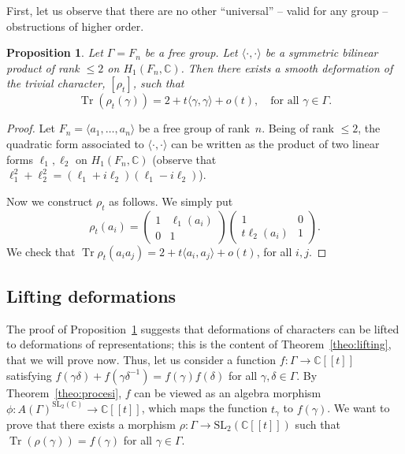 \documentclass[JEP,XML,SOM,Unicode,NoEqCountersInSection]{cedram}
\newcommand{\lbr}{[\![}
\newcommand{\rbr}{]\!]}
\newtheorem{proposition}[theorem]{Proposition}
\theoremstyle{definition}
\newcommand{\CC}{\mathbb{C}}
\newcommand{\tr}{\operatorname{Tr}}
\newcommand{\SL}{\mathrm{SL}}
\begin{document}
First, let us observe that there are no other ``universal'' -- \ie valid
for any group -- obstructions of higher order.
\begin{proposition}\label{prop:PasPlusQueTrois}
Let $\Gamma=F_n$ be a free group. Let $\langle\cdot,\cdot\rangle$ be a
symmetric bilinear product of rank $\leq 2$ on $H_1(F_n,\CC)$.
Then there exists a smooth deformation
of the trivial character, $[\rho_t]$, such that
\[ \tr(\rho_t(\gamma))=2+t\langle\gamma,\gamma\rangle+
o(t), \quad\text{for all }\gamma\in\Gamma. \]
\end{proposition}

\begin{proof}
Let $F_n=\langle a_1,\ldots,a_n\rangle$ be a free group of rank~$n$.
Being of rank $\leq 2$, the quadratic form associated to
$\langle\cdot,\cdot\rangle$
can be written as the product of two linear forms $\ell_1,\ell_2$ on
$H_1(F_n,\CC)$
(observe that $\ell_1^2+\ell_2^2=(\ell_1+i\ell_2)(\ell_1-i\ell_2)$).

Now we construct $\rho_t$ as follows. We simply put
\[ \rho_t(a_i)=\left(\begin{array}{cc}1 & \ell_1(a_i) \\ 0 & 1 \end{array}
\right)\left(\begin{array}{cc}1 & 0 \\ t\ell_2(a_i) & 1\end{array}\right).\]
We check that $\tr\rho_t(a_ia_j)=2+t\langle a_i,a_j\rangle+o(t)$,
for all $i,j$.
\end{proof}

\subsection{Lifting deformations}\label{sec:lifting}

The proof of Proposition~\ref{prop:PasPlusQueTrois} suggests that
deformations of characters can be lifted to deformations of representations;
this is the content of Theorem~\ref{theo:lifting}, that we will prove now.
Thus, let us consider a function $f\colon\Gamma\to\CC\lbr t\rbr$ satisfying
$f(\gamma\delta)+f(\gamma\delta^{-1})=f(\gamma)f(\delta)$ for all
$\gamma,\delta\in\Gamma$. By Theorem~\ref{theo:procesi},
$f$ can be viewed as an algebra morphism
$\phi\colon A(\Gamma)^{\SL_2(\CC)}\to\CC\lbr t\rbr$, which maps the function
$t_\gamma$ to $f(\gamma)$. We want to prove that there exists a morphism
$\rho\colon\Gamma\to\SL_2(\CC\lbr t\rbr)$ such that $\tr(\rho(\gamma))=f(\gamma)$
for all $\gamma\in\Gamma$.
\end{document}
